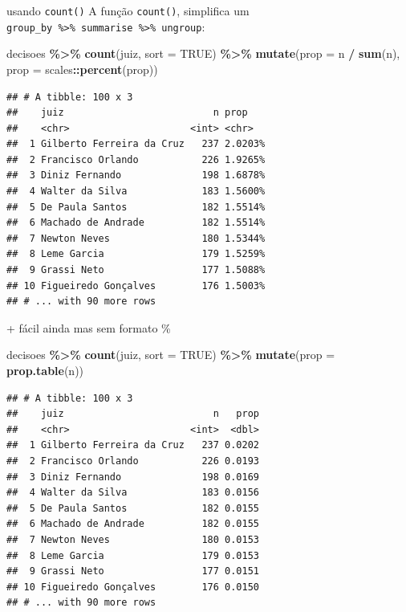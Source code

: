 \documentclass[
  10pt,
  ignorenonframetext,
]{beamer}
\newenvironment{Shaded}{\begin{snugshade}}{\end{snugshade}}
\newcommand{\DataTypeTok}[1]{\textcolor[rgb]{0.13,0.29,0.53}{#1}}
\newcommand{\KeywordTok}[1]{\textcolor[rgb]{0.13,0.29,0.53}{\textbf{#1}}}
\newcommand{\NormalTok}[1]{#1}
\newcommand{\OperatorTok}[1]{\textcolor[rgb]{0.81,0.36,0.00}{\textbf{#1}}}
\newcommand{\OtherTok}[1]{\textcolor[rgb]{0.56,0.35,0.01}{#1}}
\newcommand{\StringTok}[1]{\textcolor[rgb]{0.31,0.60,0.02}{#1}}
\begin{document}
\begin{frame}[fragile]{usando \texttt{count()}}
\protect\hypertarget{usando-count}{}
A função \texttt{count()}, simplifica um
\texttt{group\_by\ \%\textgreater{}\%\ summarise\ \%\textgreater{}\%\ ungroup}:

\begin{Shaded}
\begin{Highlighting}[]
\NormalTok{decisoes }\OperatorTok{\%\textgreater{}\%}\StringTok{ }
\StringTok{  }\KeywordTok{count}\NormalTok{(juiz, }\DataTypeTok{sort =} \OtherTok{TRUE}\NormalTok{) }\OperatorTok{\%\textgreater{}\%}\StringTok{ }
\StringTok{  }\KeywordTok{mutate}\NormalTok{(}\DataTypeTok{prop =}\NormalTok{ n }\OperatorTok{/}\StringTok{ }\KeywordTok{sum}\NormalTok{(n), }
         \DataTypeTok{prop =}\NormalTok{ scales}\OperatorTok{::}\KeywordTok{percent}\NormalTok{(prop))}
\end{Highlighting}
\end{Shaded}

\begin{verbatim}
## # A tibble: 100 x 3
##    juiz                          n prop   
##    <chr>                     <int> <chr>  
##  1 Gilberto Ferreira da Cruz   237 2.0203%
##  2 Francisco Orlando           226 1.9265%
##  3 Diniz Fernando              198 1.6878%
##  4 Walter da Silva             183 1.5600%
##  5 De Paula Santos             182 1.5514%
##  6 Machado de Andrade          182 1.5514%
##  7 Newton Neves                180 1.5344%
##  8 Leme Garcia                 179 1.5259%
##  9 Grassi Neto                 177 1.5088%
## 10 Figueiredo Gonçalves        176 1.5003%
## # ... with 90 more rows
\end{verbatim}
\end{frame}

\begin{frame}[fragile]{+ fácil ainda}
\protect\hypertarget{fuxe1cil-ainda}{}
mas sem formato \%

\begin{Shaded}
\begin{Highlighting}[]
\NormalTok{decisoes }\OperatorTok{\%\textgreater{}\%}\StringTok{ }
\StringTok{  }\KeywordTok{count}\NormalTok{(juiz, }\DataTypeTok{sort =} \OtherTok{TRUE}\NormalTok{) }\OperatorTok{\%\textgreater{}\%}\StringTok{ }
\StringTok{  }\KeywordTok{mutate}\NormalTok{(}\DataTypeTok{prop =} \KeywordTok{prop.table}\NormalTok{(n))}
\end{Highlighting}
\end{Shaded}

\begin{verbatim}
## # A tibble: 100 x 3
##    juiz                          n   prop
##    <chr>                     <int>  <dbl>
##  1 Gilberto Ferreira da Cruz   237 0.0202
##  2 Francisco Orlando           226 0.0193
##  3 Diniz Fernando              198 0.0169
##  4 Walter da Silva             183 0.0156
##  5 De Paula Santos             182 0.0155
##  6 Machado de Andrade          182 0.0155
##  7 Newton Neves                180 0.0153
##  8 Leme Garcia                 179 0.0153
##  9 Grassi Neto                 177 0.0151
## 10 Figueiredo Gonçalves        176 0.0150
## # ... with 90 more rows
\end{verbatim}
\end{frame}
\end{document}
